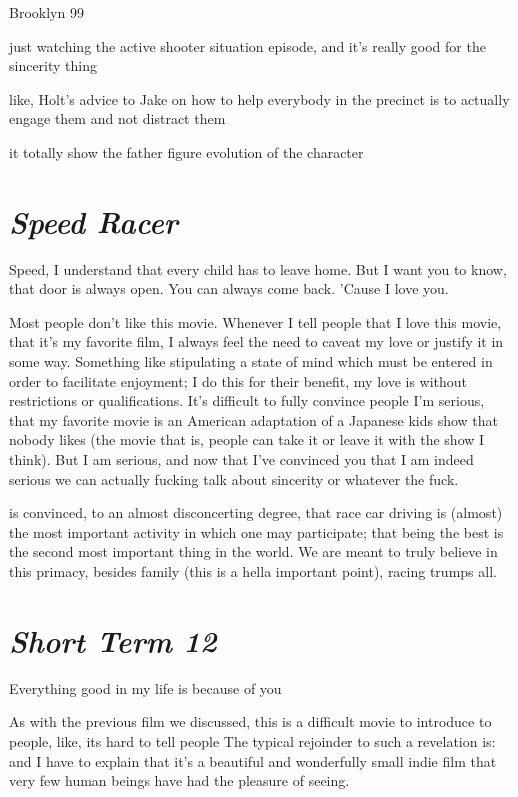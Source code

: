 \documentclass[../butidigress.tex]{subfiles}
\begin{document}
\begin{somenotes}{Brooklyn 99}
    \item just watching the active shooter situation episode, and it's really good for the sincerity thing
    \item like, Holt's advice to Jake on how to help everybody in the precinct is to actually engage them and not distract them
    \item it totally show the father figure evolution of the character
\end{somenotes}

\section{\textit{Speed Racer}}
\epigraph{Speed, I understand that every child has to leave home. But I want you to know, that door is always open. You can always come back. 'Cause I love you.}{}

Most people don't like this movie.
Whenever I tell people that I love this movie, that it's my favorite film, I always feel the need to caveat my love or justify it in some way.
Something like stipulating a state of mind which must be entered in order to facilitate enjoyment; I do this for their benefit, my love is without restrictions or qualifications.
It's difficult to fully convince people I'm serious, that my favorite movie is an American adaptation of a Japanese kids show that nobody likes (the movie that is, people can take it or leave it with the show I think).
But I am serious, and now that I've convinced you that I am indeed serious we can actually fucking talk about sincerity or whatever the fuck.

 is convinced, to an almost disconcerting degree, that race car driving is (almost) the most important activity in which one may participate; that being the best is the second most important thing in the world.
We are meant to truly believe in this primacy, besides family (this is a hella important point), racing trumps all.

\section{\textit{Short Term 12}}
\epigraph{Everything good in my life is because of you}{}

As with the previous film we discussed, this is a difficult movie to introduce to people, like, its hard to tell people 
The typical rejoinder to such a revelation is:  and I have to explain that it's a beautiful and wonderfully small indie film that very few human beings have had the pleasure of seeing.
\end{document}
